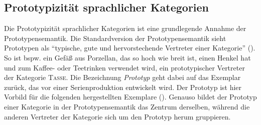 \subsection{Prototypizität sprachlicher Kategorien}
\label{standard}

Die Prototypizität sprachlicher Kategorien ist eine grundlegende Annahme der Prototypensemantik. Die Standardversion der Prototypensemantik sieht Prototypen als "`typische, gute und hervorstechende Vertreter einer Kategorie"' (\cite[33]{Schmid.2000}). So ist bspw. ein Gefäß aus Porzellan, das so hoch wie breit ist, einen Henkel hat und zum Kaffee- oder Teetrinken verwendet wird, ein prototypischer Vertreter der Kategorie \textsc{Tasse}. Die Bezeichnung \textit{Prototyp} geht dabei auf das Exemplar zurück, das vor einer Serienproduktion entwickelt wird. Der Prototyp ist hier Vorbild für die folgenden hergestellten Exemplare (\cite[31]{Kleiber.1993}). Genauso bildet der Prototyp einer Kategorie in der Prototypensemantik das Zentrum derselben, während die anderen Vertreter der Kategorie sich um den Prototyp herum gruppieren.

